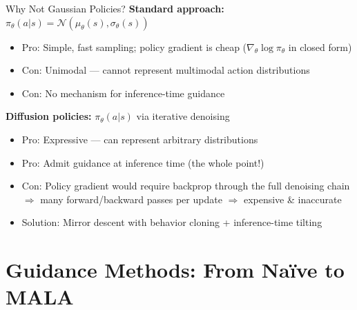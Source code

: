\documentclass[aspectratio=169,11pt]{beamer}
\begin{document}
\begin{frame}{Why Not Gaussian Policies?}
\textbf{Standard approach:} $\pi_\theta(a|s) = \mathcal{N}(\mu_\theta(s), \sigma_\theta(s))$

\begin{itemize}\setlength\itemsep{6pt}
  \item \textcolor{greenaccent}{Pro:} Simple, fast sampling; policy gradient is cheap ($\nabla_\theta \log \pi_\theta$ in closed form)
  \item \textcolor{redaccent}{Con:} Unimodal --- cannot represent multimodal action distributions
  \item \textcolor{redaccent}{Con:} No mechanism for inference-time guidance
\end{itemize}

\pause
\medskip
\textbf{Diffusion policies:} $\pi_\theta(a|s)$ via iterative denoising
\begin{itemize}\setlength\itemsep{6pt}
  \item \textcolor{greenaccent}{Pro:} Expressive --- can represent arbitrary distributions
  \item \textcolor{greenaccent}{Pro:} Admit guidance at inference time (the whole point!)
  \item \textcolor{redaccent}{Con:} Policy gradient would require backprop through the full denoising chain\\
        $\Rightarrow$ many forward/backward passes per update $\Rightarrow$ expensive \& inaccurate
  \item \textcolor{accent}{Solution:} Mirror descent with behavior cloning + inference-time tilting
\end{itemize}
\end{frame}

\section{Guidance Methods: From Na\"ive to MALA}
\end{document}
